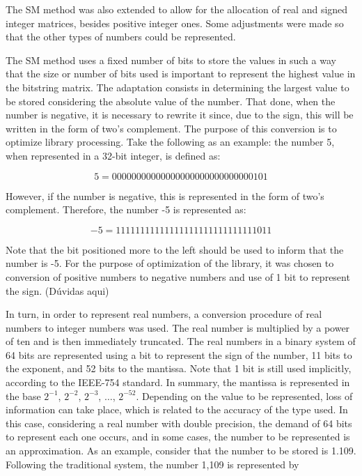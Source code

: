 \documentclass[10pt]{article}
\begin{document}
The SM method was also extended to allow for the allocation of real and 
signed integer matrices, besides positive integer ones. Some adjustments were 
made so that the other types of numbers could be represented. 

The SM method uses a fixed number of bits to store the values in such a way that
the size or number of bits used is important to represent the highest value in 
the bitstring matrix. The adaptation 
consists in determining the largest value to be stored considering the absolute 
value of the number. That done,
when the number is negative, it is necessary to rewrite it since, due to the 
sign, this will be written in the form of 
two's complement. The purpose of this conversion is to optimize library 
processing. Take the following as an example: 
the number 5, when represented in a 32-bit integer, is defined as:

\begin{equation}\nonumber
 5 = 00000000 00000000 00000000 00000101
\end{equation}

However, if the number is negative, this is represented in the form of two's 
complement. Therefore, the number -5 is 
represented as:

\begin{equation}\nonumber
 -5 = 11111111 11111111 11111111 11111011
\end{equation}

Note that the bit positioned more to the left should be used to inform that the 
number is -5. For the purpose of 
optimization of the library, it was chosen to conversion of positive numbers to 
negative numbers and use of 1 
bit to represent the sign. (Dúvidas aqui)

In turn, in order to represent real numbers, a conversion procedure of real 
numbers to integer numbers was used. The 
real number is multiplied by a power of ten and is then immediately truncated. 
The real numbers in a binary system of 64 
bits are represented using a bit to represent the sign of the number, 11 bits to 
the exponent, and 52 bits to the 
mantissa. Note that 1 bit is still used implicitly, according to the IEEE-754 
standard. In summary, the mantissa is 
represented in the base $2^{-1}$, $2^{-2}$, $2^{-3}$, $\hdots$, $2^{-52}$. 
Depending on the value to be represented, 
loss of information can take place, which is related to the accuracy of the type 
used. In this case, considering a real 
number with double precision, the demand of 64 bits to represent each one 
occurs, and in some cases, the number to be 
represented is an approximation. As an example, consider that the number to be 
stored is 1.109. Following the 
traditional system, the number 1,109 is represented by
\end{document}
